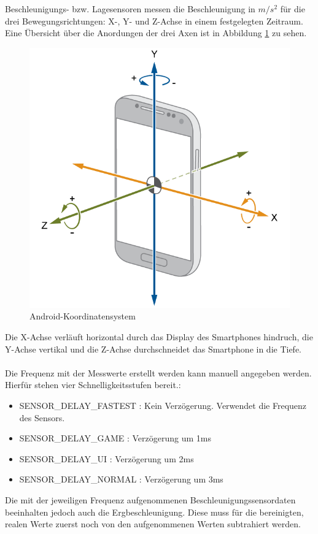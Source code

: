 \documentclass[11pt,a4paper]{report}
\begin{document}
Beschleunigungs- bzw. Lagesensoren messen die Beschleunigung in $m/s^2$ für die drei Bewegungsrichtungen: X-, Y- und Z-Achse in einem festgelegten Zeitraum.
Eine Übersicht über die Anordungen der drei Axen ist in Abbildung \ref{fig:and_axes} zu sehen.
\begin{figure}[htbp]
  \centering
  \includegraphics[width=.7\textwidth]{images/android_axes.png}
  \caption{Android-Koordinatensystem}
  \label{fig:and_axes}
\end{figure}
Die X-Achse verläuft horizontal durch das Display des Smartphones hindruch, die Y-Achse vertikal und die Z-Achse durchschneidet das Smartphone in die Tiefe.
\\\\
Die Frequenz mit der Messwerte erstellt werden kann manuell angegeben werden.
Hierfür stehen vier Schnelligkeitsstufen bereit.:
\begin{itemize}
  \item SENSOR\_DELAY\_FASTEST : Kein Verzögerung. Verwendet die Frequenz des Sensors.
  \item SENSOR\_DELAY\_GAME : Verzögerung um 1ms
  \item SENSOR\_DELAY\_UI : Verzögerung um 2ms
  \item SENSOR\_DELAY\_NORMAL : Verzögerung um 3ms
\end{itemize}
Die mit der jeweiligen Frequenz aufgenommenen Beschleunigungssensordaten beeinhalten jedoch auch die Ergbeschleunigung.
Diese muss für die bereinigten, realen Werte zuerst noch von den aufgenommenen Werten subtrahiert werden\cite{accel_g}.
\end{document}
